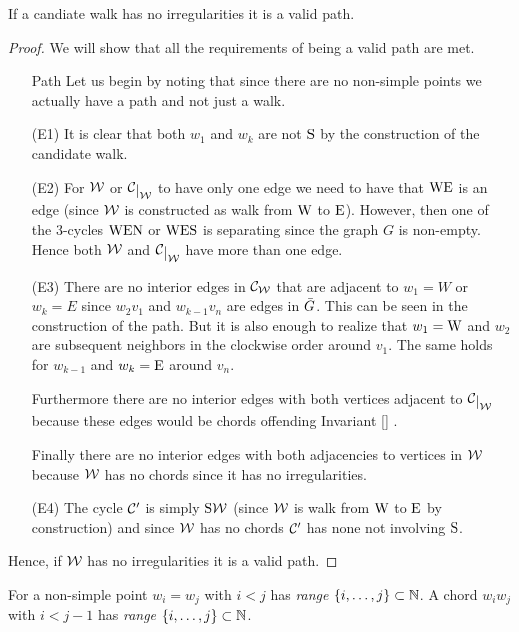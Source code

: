 \begin{lemma}
If a candiate walk has no irregularities it is a valid path.
\end{lemma}
\begin{proof} 
We will show that all the requirements of being a valid path are met.
 \begin{itemize}
\item [Path] Let us begin by noting that since there are no non-simple points we actually have a path and not just a walk.

\item[(E1)] It is clear that both $w_1$ and $w_k$ are not $\mathrm{S}$ by the construction of the candidate walk.

\item[(E2)] For $\mathcal{W}$ or $\restC \W$ to have only one edge we need to have that $\mathrm{W} \mathrm{E}$ is an edge (since $\mathcal{W}$ is constructed as walk from $\mathrm{W}$ to $\mathrm{E}$). However, then one of the $3$-cycles $\mathrm{W} \mathrm{E} \mathrm{N}$ or $\mathrm{W} \mathrm{E} \mathrm{S}$ is separating since the graph $G$ is non-empty. Hence both $\mathcal{W}$ and $\restC \W$ have more than one edge.

\item[(E3)] There are no interior edges in $\mathcal{C}_{\mathcal{W}}$ that are adjacent to $w_1 =W$ or $w_k = E$ since $w_2 v_1$ and $w_{k-1} v_n$ are edges in $\bar{G}$. This can be seen in the construction of the path. But it is also enough to realize that $w_1=\mathrm{W}$ and $w_2$ are subsequent neighbors in the clockwise order around $v_1$. The same holds for $w_{k-1}$ and $w_k=\mathrm{E}$ around $v_n$. 

Furthermore there are no interior edges with both vertices adjacent to $\restC{\W}$ because these edges would be chords offending Invariant \ref{} . 

Finally there are no interior edges with both adjacencies to vertices in $\mathcal{W}$ because $\mathcal{W}$ has no chords since it has no irregularities.

\item[ (E4)] The cycle $\mathcal{C}'$ is simply $\mathrm{S} \mathcal{W}$ (since $\mathcal{W}$ is  walk from $\mathrm{W}$ to $\mathrm{E}$ by construction) and since $\mathcal{W}$ has no chords $\mathcal{C}'$ has none not involving $\mathrm{S}$.
\end{itemize}
Hence, if $\mathcal{W}$ has no irregularities it is a valid path. 
\end{proof}

\begin{defi}
For a non-simple point  $w_i = w_j$ with $i<j$ has \emph{range} $\left\lbrace {i, \ldots, j} \right\rbrace \subset \mathbb{N}$.
A chord $w_i w_j$ with $i< j-1$ has \emph{range} $\left\lbrace {i, \ldots, j} \right\rbrace \subset \mathbb{N}$.
\end{defi}

